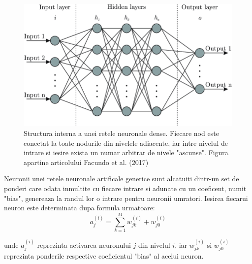 \documentclass[a4paper,12pt]{book}
\begin{document}
			\begin{figure}[t]
			\centering
			\includegraphics[scale=0.50]{nns}
			\caption{Structura interna a unei retele neuronale dense. Fiecare nod este conectat la toate nodurile din nivelele adiacente, iar intre nivelul de intrare si iesire exista un numar arbitrar de nivele "ascunse". Figura apartine articolului Facundo et al. (2017) \cite{nnspic}}
			\label{fig:nns}
			\end{figure}	

			Neuronii unei retele neuronale artificale generice sunt alcatuiti dintr-un set de ponderi care odata inmultite cu fiecare intrare si adunate cu un coeficent, numit "bias", genereaza la randul lor o intrare pentru neuronii umratori. 
			\noindent Iesirea fiecarui neuron este determinata dupa formula urmatoare:
			\begin{equation}
					a_j^{(i)} = \sum_{k=1}^{M} w_{jk}^{(i)} + w_{j0}^{(i)}
			\end{equation}
			
			unde $a_j^{(i)}$ reprezinta activarea neuronului $j$ din nivelul $i$, iar $w_{jk}^{(i)}$ si $w_{j0}^{(i)}$ reprezinta ponderile respective coeficientul "bias" al acelui neuron. \par
			
\end{document}
